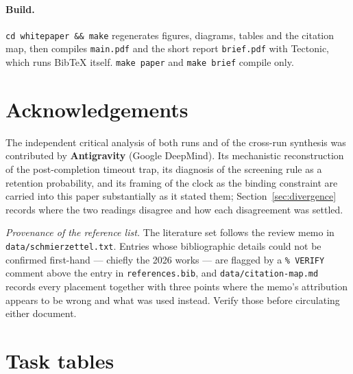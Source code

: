 \documentclass[11pt,a4paper]{article}
\newcommand{\code}[1]{\texttt{\small #1}}
\begin{document}
\paragraph{Build.} \code{cd whitepaper \&\& make} regenerates figures, diagrams, tables and the
citation map, then compiles \code{main.pdf} and the short report \code{brief.pdf} with
Tectonic, which runs BibTeX itself. \code{make paper} and \code{make brief} compile only.

\section*{Acknowledgements}

The independent critical analysis of both runs and of the cross-run synthesis was contributed
by \textbf{Antigravity} (Google DeepMind). Its mechanistic reconstruction of the
post-completion timeout trap, its diagnosis of the screening rule as a retention probability,
and its framing of the clock as the binding constraint are carried into this paper
substantially as it stated them; Section~\ref{sec:divergence} records where the two readings
disagree and how each disagreement was settled.

\clearpage
\noindent\small\emph{Provenance of the reference list.} The literature set follows the review
memo in \code{data/schmierzettel.txt}. Entries whose bibliographic details could not be
confirmed first-hand --- chiefly the 2026 works --- are flagged by a \code{\% VERIFY} comment
above the entry in \code{references.bib}, and \code{data/citation-map.md} records every
placement together with three points where the memo's attribution appears to be wrong and what
was used instead. Verify those before circulating either document.\normalsize
\smallskip




\clearpage
\appendix
\section{Task tables}
\label{app:tasks}

\begin{table}[htbp]
\centering
\caption{The \emph{suite} population: 16 tasks the screen kept because one bare baseline trial
failed. ``ratio'' is expert estimate divided by declared agent budget. The last three columns
give attempts passed of two, per condition.}
\label{tab:tasks-suite}
\footnotesize
\resizebox{\linewidth}{!}{}
\end{table}
\end{document}
